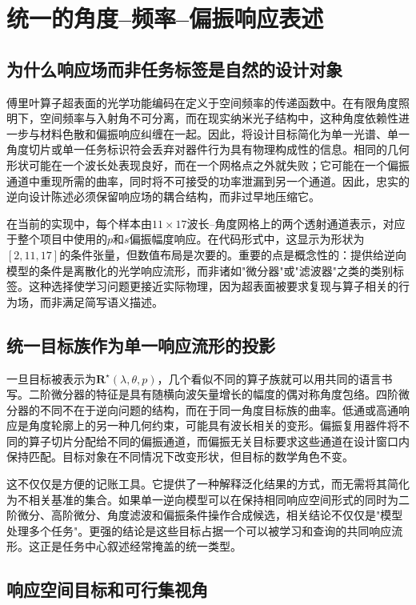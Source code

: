 \section{统一的角度--频率--偏振响应表述}

\subsection{为什么响应场而非任务标签是自然的设计对象}

傅里叶算子超表面的光学功能编码在定义于空间频率的传递函数中。在有限角度照明下，空间频率与入射角不可分离，而在现实纳米光子结构中，这种角度依赖性进一步与材料色散和偏振响应纠缠在一起。因此，将设计目标简化为单一光谱、单一角度切片或单一任务标识符会丢弃对器件行为具有物理构成性的信息。相同的几何形状可能在一个波长处表现良好，而在一个网格点之外就失败；它可能在一个偏振通道中重现所需的曲率，同时将不可接受的功率泄漏到另一个通道。因此，忠实的逆向设计陈述必须保留响应场的耦合结构，而非过早地压缩它。

在当前的实现中，每个样本由$11\times17$波长--角度网格上的两个透射通道表示，对应于整个项目中使用的$p$和$s$偏振幅度响应。在代码形式中，这显示为形状为$[2,11,17]$的条件张量，但数值布局是次要的。重要的点是概念性的：提供给逆向模型的条件是离散化的光学响应流形，而非诸如"微分器"或"滤波器"之类的类别标签。这种选择使学习问题更接近实际物理，因为超表面被要求复现与算子相关的行为场，而非满足简写语义描述。

\subsection{统一目标族作为单一响应流形的投影}

一旦目标被表示为$\mathbf{R}^{\star}(\lambda,\theta,p)$，几个看似不同的算子族就可以用共同的语言书写。二阶微分器的特征是具有随横向波矢量增长的幅度的偶对称角度包络。四阶微分器的不同不在于逆向问题的结构，而在于同一角度目标族的曲率。低通或高通响应是角度轮廓上的另一种几何约束，可能具有波长相关的变形。偏振复用器件将不同的算子切片分配给不同的偏振通道，而偏振无关目标要求这些通道在设计窗口内保持匹配。目标对象在不同情况下改变形状，但目标的数学角色不变。

这不仅仅是方便的记账工具。它提供了一种解释泛化结果的方式，而无需将其简化为不相关基准的集合。如果单一逆向模型可以在保持相同响应空间形式的同时为二阶微分、高阶微分、角度滤波和偏振条件操作合成候选，相关结论不仅仅是"模型处理多个任务"。更强的结论是这些目标占据一个可以被学习和查询的共同响应流形。这正是任务中心叙述经常掩盖的统一类型。

\subsection{响应空间目标和可行集视角}


